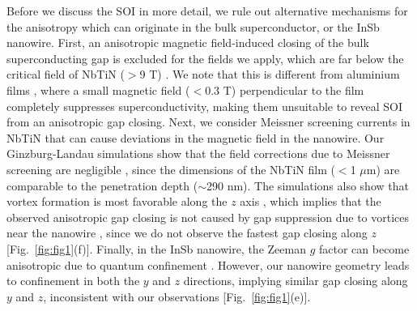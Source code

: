 Before we discuss the SOI in more detail, we rule out alternative mechanisms for the anisotropy which can originate in the bulk superconductor, or the InSb nanowire.
First, an anisotropic magnetic field-induced closing of the bulk superconducting gap is excluded for the fields we apply, which are far below the critical field of NbTiN ($>$9 T) \cite{VanWoerkom2015}.
We note that this is different from aluminium films \cite{Chang2015,Deng2016,Gazibegovic2017,Zhang2018}, where a small magnetic field ($<$0.3 T) perpendicular to the film completely suppresses superconductivity, making them unsuitable to reveal SOI from an anisotropic gap closing.
Next, we consider Meissner screening currents in NbTiN that can cause deviations in the magnetic field in the nanowire.
Our Ginzburg-Landau simulations show that the field corrections due to Meissner screening are negligible \cite{Note1}, since the dimensions of the NbTiN film ($<$1 $\mu$m) are comparable to the penetration depth ($\sim$290 nm).  %
The simulations also show that vortex formation is most favorable along the $z$ axis \cite{Note1}, which implies that the observed anisotropic gap closing is not caused by gap suppression due to vortices near the nanowire \cite{Takei2013}, since we do not observe the fastest gap closing along $z$ [Fig.~\ref{fig:fig1}(f)].  %
Finally, in the InSb nanowire, the Zeeman $g$ factor can become anisotropic due to quantum confinement \cite{Nadj-Perge2012,Pryor2006,Qu2016}.
However, our nanowire geometry leads to confinement in both the $y$ and $z$ directions, implying similar gap closing along $y$ and $z$, inconsistent with our observations [Fig.~\ref{fig:fig1}(e)].  %

